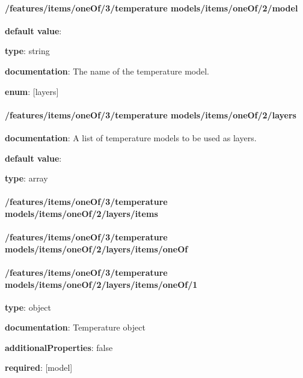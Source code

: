 \paragraph{/features/items/oneOf/3/temperature models/items/oneOf/2/model} \begin{itemized}
\item {\bf default value}: 
\item {\bf type}: string
\item {\bf documentation}: The name of the temperature model.
\item {\bf enum}: [layers]\end{itemized}\paragraph{/features/items/oneOf/3/temperature models/items/oneOf/2/layers} \begin{itemized}
\item {\bf documentation}: A list of temperature models to be used as layers.
\item {\bf default value}: 
\item {\bf type}: array
\paragraph{/features/items/oneOf/3/temperature models/items/oneOf/2/layers/items} \begin{itemized}
\end{itemized}\end{itemized}\paragraph{/features/items/oneOf/3/temperature models/items/oneOf/2/layers/items/oneOf} \begin{itemized}
\end{itemized}\paragraph{/features/items/oneOf/3/temperature models/items/oneOf/2/layers/items/oneOf/1} \begin{itemized}
\item {\bf type}: object
\item {\bf documentation}: Temperature object
\item {\bf additionalProperties}: false
\item {\bf required}: [model]\end{itemized}
